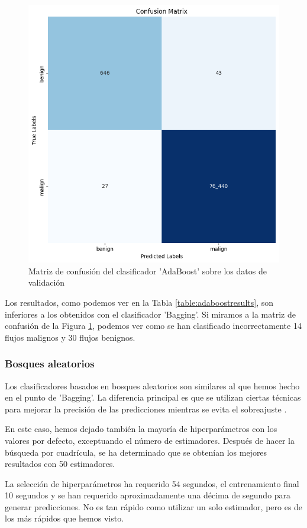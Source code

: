 \begin{figure}[H]
    \begin{center}
        \includegraphics[width=0.55\linewidth]{media/packet_pincer_train_models_adaboost.png}
    \end{center}
    \caption{Matriz de confusión del clasificador 'AdaBoost' sobre los datos de validación}\label{fig:adaboostmatrix}
\end{figure}

Los resultados, como podemos ver en la Tabla \ref{table:adaboostresults}, son inferiores a los obtenidos con el clasificador 'Bagging'. Si miramos a la matriz de confusión de la Figura \ref{fig:adaboostmatrix}, podemos ver como se han clasificado incorrectamente 14 flujos malignos y 30 flujos benignos.

\subsubsection{Bosques aleatorios} %

Los clasificadores basados en bosques aleatorios son similares al que hemos hecho en el punto de 'Bagging'. La diferencia principal es que se utilizan ciertas técnicas para mejorar la precisión de las predicciones mientras se evita el sobreajuste \cite{sklearnrandomforest}.

En este caso, hemos dejado también la mayoría de hiperparámetros con los valores por defecto, exceptuando el número de estimadores. Después de hacer la búsqueda por cuadrícula, se ha determinado que se obtenían los mejores resultados con 50 estimadores.

La selección de hiperparámetros ha requerido 54 segundos, el entrenamiento final 10 segundos y se han requerido aproximadamente una décima de segundo para generar predicciones. No es tan rápido como utilizar un solo estimador, pero es de los más rápidos que hemos visto.


